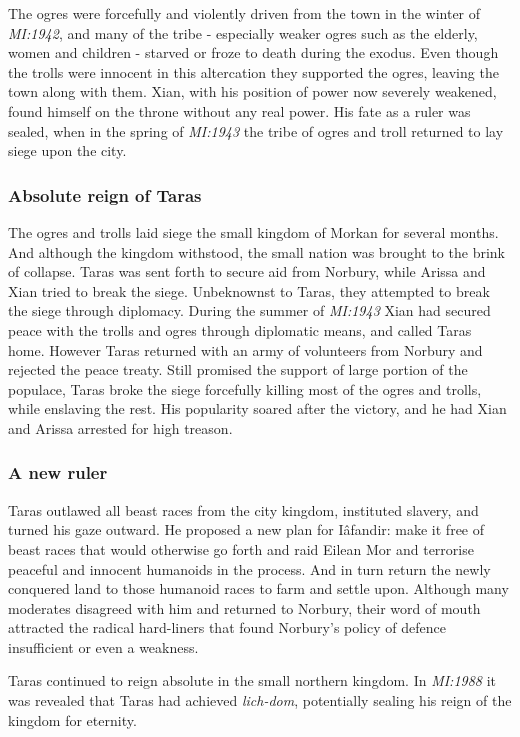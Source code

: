 The ogres were forcefully and violently driven from the town in the winter of
\emph{MI:1942}, and many of the tribe - especially weaker ogres such as the
elderly, women and children - starved or froze to death during the exodus. Even
though the trolls were innocent in this altercation they supported the ogres,
leaving the town along with them. Xian, with his position of power now
severely weakened, found himself on the throne without any real power. His
fate as a ruler was sealed, when in the spring of \emph{MI:1943} the tribe of
ogres and troll returned to lay siege upon the city. 

\subsubsection{Absolute reign of Taras}

The ogres and trolls laid siege the small kingdom of Morkan for several
months. And although the kingdom withstood, the small nation was brought to
the brink of collapse. Taras was sent forth to secure aid from Norbury, while
Arissa and Xian tried to break the siege. Unbeknownst to Taras, they attempted
to break the siege through diplomacy. During the summer of \emph{MI:1943} Xian
had secured peace with the trolls and ogres through diplomatic means, and
called Taras home. However Taras returned with an army of volunteers from
Norbury and rejected the peace treaty. Still promised the support of large
portion of the populace, Taras broke the siege forcefully killing most of the
ogres and trolls, while enslaving the rest. His popularity soared after the
victory, and he had Xian and Arissa arrested for high treason.

\subsubsection{A new ruler}

Taras outlawed all beast races from the city kingdom, instituted slavery,
and turned his gaze outward. He proposed a new plan for Iâfandir: make it free
of beast races that would otherwise go forth and raid Eilean Mor and terrorise
peaceful and innocent humanoids in the process. And in turn return the newly
conquered land to those humanoid races to farm and settle upon. Although many
moderates disagreed with him and returned to Norbury, their word of mouth
attracted the radical hard-liners that found Norbury's policy of defence
insufficient or even a weakness.

Taras continued to reign absolute in the small northern kingdom. In
\emph{MI:1988} it was revealed that Taras had achieved \emph{lich-dom},
potentially sealing his reign of the kingdom for eternity.

